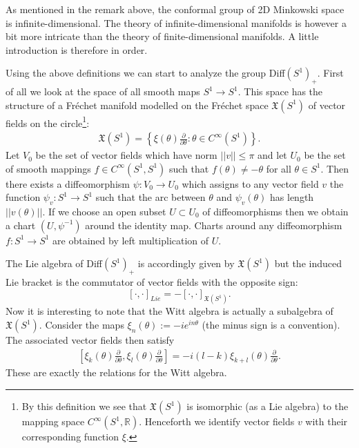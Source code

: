 	As mentioned in the remark above, the conformal group of 2D Minkowski space is infinite-dimensional. The theory of infinite-dimensional manifolds is however a bit more intricate than the theory of finite-dimensional manifolds. A little introduction is therefore in order.


	Using the above definitions we can start to analyze the group Diff$(S^1)_+$. First of all we look at the space of all smooth maps $S^1\rightarrow S^1$. This space has the structure of a Fr\'echet manifold modelled on the Fr\'echet space $\mathfrak{X}(S^1)$ of vector fields on the circle\footnote{By this definition we see that $\mathfrak{X}(S^1)$ is isomorphic (as a Lie algebra) to the mapping space $C^\infty(S^1, \mathbb{R})$. Henceforth we identify vector fields $v$ with their corresponding function $\xi$.}:
	\begin{gather}
		\mathfrak{X}(S^1) = \left\{\xi(\theta)\frac{\partial}{\partial\theta}:\theta\in C^\infty(S^1)\right\}.
	\end{gather}
	Let $V_0$ be the set of vector fields which have norm $||v||\leq\pi$ and let $U_0$ be the set of smooth mappings $f\in C^\infty(S^1, S^1)$ such that $f(\theta)\neq-\theta$ for all $\theta\in S^1$. Then there exists a diffeomorphism $\psi:V_0\rightarrow U_0$ which assigns to any vector field $v$ the function $\psi_v:S^1\rightarrow S^1$ such that the arc between $\theta$ and $\psi_v(\theta)$ has length $||v(\theta)||$. If we choose an open subset $U\subset U_0$ of diffeomorphisms then we obtain a chart $(U, \psi^{-1})$ around the identity map. Charts around any diffeomorphism $f:S^1\rightarrow S^1$ are obtained by left multiplication of $U$.

	The Lie algebra of Diff$(S^1)_+$ is accordingly given by $\mathfrak{X}(S^1)$ but the induced Lie bracket is the commutator of vector fields with the opposite sign: \[[\cdot, \cdot]_{Lie} = -[\cdot, \cdot]_{\mathfrak{X}(S^1)}.\] Now it is interesting to note that the Witt algebra is actually a subalgebra of $\mathfrak{X}(S^1)$. Consider the maps $\xi_n(\theta):=-ie^{in\theta}$ (the minus sign is a convention). The associated vector fields then satisfy
	\begin{gather}
		\left[\xi_k(\theta)\frac{\partial}{\partial\theta}, \xi_l(\theta)\frac{\partial}{\partial\theta}\right] = -i(l-k)\xi_{k+l}(\theta)\frac{\partial}{\partial\theta}.
	\end{gather}
	These are exactly the relations for the Witt algebra.

